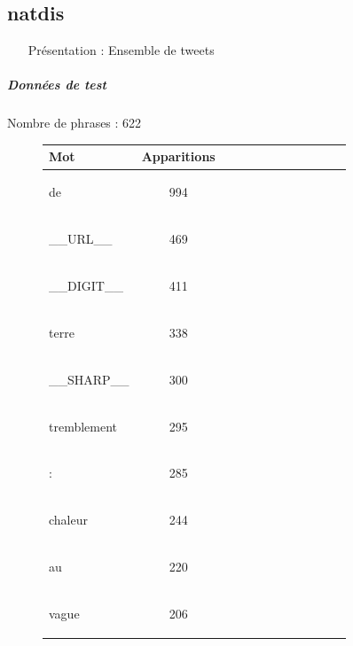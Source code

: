  \subsection{natdis } 
 \begin{itemize} 
 \item[Présentation :] Ensemble de tweets

 \end{itemize}  \subparagraph{Données de test \\ }  
 Nombre de phrases : 622\\ 
\begin{figure}[H] \begin{minipage}{0.48\textwidth} \centering \begin{tabular}{|l || *{11 }{|c} |} \hline
Mot & Apparitions  \\ \hline
\begin{verb} de \end{verb} &994\\ \hline
\begin{verb} __URL__ \end{verb} &469\\ \hline
\begin{verb} __DIGIT__ \end{verb} &411\\ \hline
\begin{verb} terre \end{verb} &338\\ \hline
\begin{verb} __SHARP__ \end{verb} &300\\ \hline
\begin{verb} tremblement \end{verb} &295\\ \hline
\begin{verb} : \end{verb} &285\\ \hline
\begin{verb} chaleur \end{verb} &244\\ \hline
\begin{verb} au \end{verb} &220\\ \hline
\begin{verb} vague \end{verb} &206\\ \hline


\end{tabular}
\end{minipage}
\end{figure}
